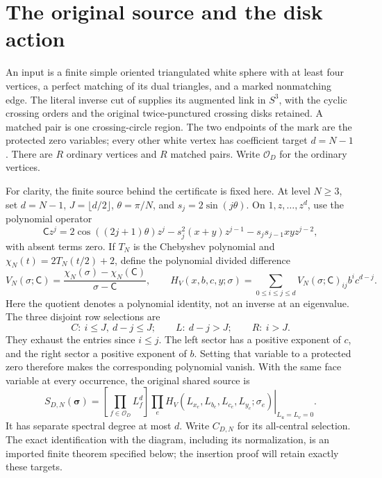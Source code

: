 \documentclass[11pt]{article}
\numberwithin{equation}{section}
\theoremstyle{definition}\newtheorem{definition}[theorem]{Definition}
\theoremstyle{remark}\newtheorem{remark}[theorem]{Remark}
\begin{document}
\section{The original source and the disk action}\label{ti:sec-1}

An input is a finite simple oriented triangulated white sphere with at least four vertices, a perfect matching of its dual triangles, and a marked nonmatching edge. The literal inverse cut of \cite[Section 2]{Marked} supplies its augmented link in \(S^3\), with the cyclic crossing orders and the original twice-punctured crossing disks retained. A matched pair is one crossing-circle region. The two endpoints of the mark are the protected zero variables; every other white vertex has coefficient target \(d=N-1\). There are $R$ ordinary vertices and $R$ matched pairs. Write $\mathcal O_D$ for the ordinary vertices.

For clarity, the finite source behind the certificate is fixed here.
At level \(N\ge3\), set \(d=N-1\), \(J=\lfloor d/2\rfloor\),
\(\theta=\pi/N\), and \(s_j=2\sin(j\theta)\). On
\(1,z,\ldots,z^d\), use the polynomial operator
\begin{equation}\label{ti:operator}
\mathsf C z^j=2\cos((2j+1)\theta)z^j
-s_j^2(x+y)z^{j-1}-s_js_{j-1}xy z^{j-2},
\end{equation}
with absent terms zero. If \(T_N\) is the Chebyshev polynomial and
\(\chi_N(t)=2T_N(t/2)+2\), define the polynomial divided difference
\[
V_N(\sigma;\mathsf C)=
\frac{\chi_N(\sigma)-\chi_N(\mathsf C)}{\sigma-\mathsf C},\qquad
H_V(x,b,c,y;\sigma)=\sum_{0\le i\le j\le d}
       V_N(\sigma;\mathsf C)_{ij}b^ic^{d-j}.
\]
Here the quotient denotes a polynomial identity, not an inverse at
an eigenvalue. The three disjoint row selections are
\[
C:\ i\le J,\ d-j\le J;\qquad
L:\ d-j>J;\qquad R:\ i>J.
\]
They exhaust the entries since \(i\le j\). The left sector has a positive exponent of $c$, and the right
sector a positive exponent of $b$. Setting that variable to a protected
zero therefore makes the corresponding polynomial vanish. With the same face
variable at every occurrence, the original shared source is
\begin{equation}\label{ti:finite-source}
S_{D,N}(\boldsymbol\sigma)=
\left[\prod_{f\in\mathcal O_D} L_f^d\right]
\left.\prod_e H_V(L_{x_e},L_{b_e},L_{c_e},L_{y_e};\sigma_e)
\right|_{L_u=L_v=0}.
\end{equation}
It has separate spectral degree at most \(d\). Write \(C_{D,N}\)
for its all-central selection. The exact identification with the
diagram, including its normalization, is an imported finite theorem
specified below; the insertion proof will retain exactly these targets.
\end{document}
